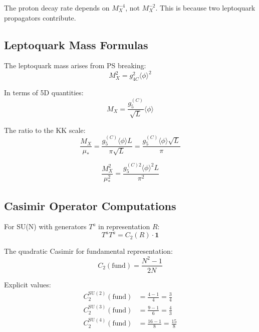 \documentclass[11pt,a4paper]{article}
\theoremstyle{definition}
\begin{document}
\begin{trapbox}
The proton decay rate depends on $M_X^{-4}$, not $M_X^{-2}$.
This is because two leptoquark propagators contribute.
\end{trapbox}

\subsection{Leptoquark Mass Formulas}
\label{subsec:leptoquark-mass}

The leptoquark mass arises from PS breaking:
\begin{equation}
  \label{eq:leptoquark-mass-1}
  M_X^2 = g_{4C}^2 \langle \phi \rangle^2
\end{equation}

In terms of 5D quantities:
\begin{equation}
  \label{eq:leptoquark-mass-2}
  M_X = \frac{g_5^{(C)}}{\sqrt{L}} \langle \phi \rangle
\end{equation}

The ratio to the KK scale:
\begin{equation}
  \label{eq:mx-to-kk}
  \frac{M_X}{\mu_*} = \frac{g_5^{(C)} \langle \phi \rangle L}{\pi \sqrt{L}} = \frac{g_5^{(C)} \langle \phi \rangle \sqrt{L}}{\pi}
\end{equation}

\begin{equation}
  \label{eq:mx-ratio-alt}
  \frac{M_X^2}{\mu_*^2} = \frac{g_5^{(C)2} \langle \phi \rangle^2 L}{\pi^2}
\end{equation}

\subsection{Casimir Operator Computations}
\label{subsec:casimir-compute}

For SU(N) with generators $T^a$ in representation $R$:
\begin{equation}
  \label{eq:casimir-def}
  T^a T^a = C_2(R) \cdot \mathbf{1}
\end{equation}

The quadratic Casimir for fundamental representation:
\begin{equation}
  \label{eq:casimir-fund-derive}
  C_2(\text{fund}) = \frac{N^2 - 1}{2N}
\end{equation}

Explicit values:
\begin{align}
  \label{eq:casimir-su2}
  C_2^{\text{SU}(2)}(\text{fund}) &= \frac{4 - 1}{4} = \frac{3}{4} \\
  \label{eq:casimir-su3}
  C_2^{\text{SU}(3)}(\text{fund}) &= \frac{9 - 1}{6} = \frac{4}{3} \\
  \label{eq:casimir-su4}
  C_2^{\text{SU}(4)}(\text{fund}) &= \frac{16 - 1}{8} = \frac{15}{8}
\end{align}
\end{document}
